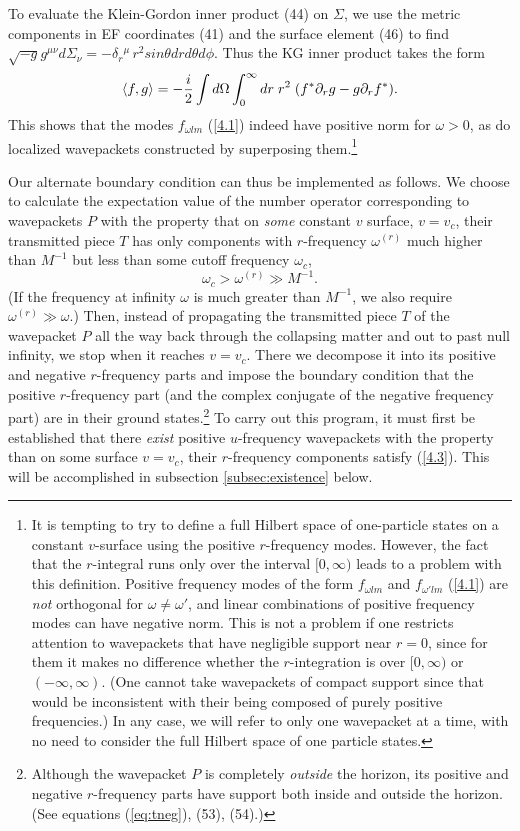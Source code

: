 \documentclass[12pt]{article}
\def\o{\omega}
\def\la{\langle}
\def\ra{\rangle}
\begin{document}
To evaluate the Klein-Gordon inner product (44) on $\Sigma$,
we use the metric components in EF
coordinates (41) and the surface element (46) to find
$\sqrt{-g}g^{\mu\nu}d\Sigma_\nu
=-\delta_r{}^\mu\, r^2 sin\theta dr d\theta d\phi$.
Thus the KG inner product takes the form
\begin{equation}
\la f,g\ra = -{i\over2}\int d\Omega \int_0^\infty dr
\; r^2 \; (f^*\partial_r g-g\partial_rf^*).
\label{KGnorm}
\end{equation}
This shows that the modes $f_{\o lm}$ (\ref{4.1}) indeed have
positive norm for $\o>0$, as do localized wavepackets
constructed by superposing them.\footnote{It is tempting
to try to define a
full Hilbert space of one-particle states on a constant
$v$-surface using the positive $r$-frequency modes.
However, the fact that the $r$-integral runs
only over the interval $[0,\infty)$ leads to a problem with
this definition. Positive frequency modes of the form $f_{\o lm}$
and $f_{\o' lm}$ (\ref{4.1}) are {\it not} orthogonal for $\o\ne\o'$,
and linear combinations of positive frequency modes can have
negative norm. This is not a problem if one restricts
attention to wavepackets that have negligible
support near $r=0$, since for them it makes no difference whether
the $r$-integration is over $[0,\infty)$ or $(-\infty,\infty)$.
(One cannot take wavepackets of compact support since that would
be inconsistent with their being composed of purely positive
frequencies.) In any case, we will refer to only one wavepacket
at a time, with no need to consider the full Hilbert space of
one particle states.}

Our alternate boundary condition can thus be implemented as
follows. We choose to calculate the expectation value of
the number operator corresponding to wavepackets $P$
with the property that on {\it some} constant $v$ surface,
$v=v_c$, their transmitted piece $T$ has only
components with $r$-frequency $\o^{(r)}$ much higher than $M^{-1}$
but less than some cutoff frequency $\omega_c$,
\begin{equation}
\o_c>\o^{(r)}\gg M^{-1}.
\label{4.3}
\end{equation}
(If the frequency at infinity $\o$ is much greater than
$M^{-1}$, we also require $\o^{(r)}\gg\o$.)
Then, instead of propagating the transmitted
piece $T$ of the wavepacket $P$ all the way back
through the collapsing matter and out to past null infinity,
we stop when it reaches $v=v_c$.
There we decompose it into its positive and negative
$r$-frequency parts and impose the boundary condition that the
positive $r$-frequency part (and the complex conjugate of
the negative frequency part) are in their ground
states.\footnote{Although the wavepacket $P$ is completely
{\it outside} the horizon, its positive and negative
$r$-frequency parts have support both inside and outside the
horizon. (See equations (\ref{eq:tneg}), (53), (54).)}
To carry out this program, it must first be established that
there {\it exist} positive $u$-frequency wavepackets with the
property than on some surface $v=v_c$, their $r$-frequency
components satisfy (\ref{4.3}). This will be accomplished in
subsection \ref{subsec:existence} below.
\end{document}
